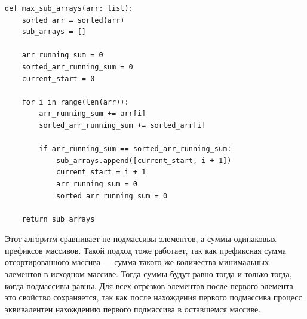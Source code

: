 \documentclass{article}
\begin{document}
\begin{enumerate}
          \begin{lstlisting}
def max_sub_arrays(arr: list):
    sorted_arr = sorted(arr)
    sub_arrays = []

    arr_running_sum = 0
    sorted_arr_running_sum = 0
    current_start = 0

    for i in range(len(arr)):
        arr_running_sum += arr[i]
        sorted_arr_running_sum += sorted_arr[i]

        if arr_running_sum == sorted_arr_running_sum:
            sub_arrays.append([current_start, i + 1])
            current_start = i + 1
            arr_running_sum = 0
            sorted_arr_running_sum = 0

    return sub_arrays
          \end{lstlisting}

          Этот алгоритм сравнивает не подмассивы элементов,
          а суммы одинаковых префиксов массивов.
          Такой подход тоже работает, так как префиксная
          сумма отсортированного массива --- сумма такого
          же количества минимальных элементов в исходном
          массиве. Тогда суммы будут равно тогда и
          только тогда, когда подмассивы равны. Для всех
          отрезков элементов после первого элемента это
          свойство сохраняется, так как после нахождения
          первого подмассива процесс эквивалентен нахождению
          первого подмассива в оставшемся массиве.

\end{enumerate}
\end{document}
